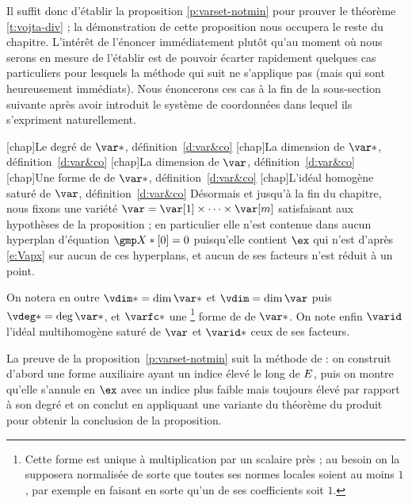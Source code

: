 Il suffit donc d'établir la proposition \ref{p:varset-notmin} pour prouver le
théorème \ref{t:vojta-div} ; la démonstration de cette proposition nous
occupera le reste du chapitre. L'intérêt de l'énoncer immédiatement plutôt
qu'au moment où nous serons en mesure de l'établir est de pouvoir écarter
rapidement quelques cas particuliers pour lesquels la méthode qui suit ne
s'applique pas (mais qui sont heureusement immédiats). Nous énoncerons ces cas
à la fin de la sous-section suivante après avoir introduit le système de
coordonnées dans lequel ils s'expriment naturellement.

\begin{tdef} \label{d:var&co}
  \nomuse {}
  \nomuse{\vdeg*}[chap]{Le degré de \( \var* \), définition~\ref{d:var&co}}
  \nomuse{\vdim*}[chap]{La dimension de \( \var* \),
    définition~\ref{d:var&co}}
  \nomuse{\vdim }[chap]{La dimension de \( \var \), définition~\ref{d:var&co}}
  \nomuse{\varfc*}[chap]{Une forme de  de \( \var* \),
    définition~\ref{d:var&co}}
  \nomuse{\varid}[chap]{L'idéal homogène saturé de \( \var \),
    définition~\ref{d:var&co}}
  Désormais et jusqu'à la fin du chapitre, nous fixons une variété
  \( \var = \var[1] \times \dots \times \var[\puiss] \) satisfaisant aux
  hypothèses de la proposition ; en particulier elle n'est contenue dans aucun
  hyperplan d'équation \( \vmp*[0] = 0 \) puisqu'elle contient
  \( \ex \) qui n'est d'après \eqref{e:Vapx} sur aucun de ces hyperplans, et
  aucun de ses facteurs n'est réduit à un point.

  On notera en outre \( \vdim* = \dim \var* \) et \( \vdim = \dim \var \) puis
  \( \vdeg* = \deg \var* \), et \( \varfc* \) une
  \footnote{\label{fn:varfc}Cette forme est unique à multiplication par un
    scalaire près ; au besoin on la supposera normalisée de sorte que toutes
    ses normes locales soient au moins \( 1 \), par exemple en faisant en
    sorte qu'un de ses coefficients soit \( 1 \).}
  forme de  de \( \var* \). On note enfin \( \varid \) l'idéal
  multihomogène saturé de $\var$ et $\varid*$ ceux de ses facteurs.
\end{tdef}

La preuve de la proposition~\ref{p:varset-notmin} suit la méthode de
\TS : on construit d'abord une forme auxiliaire ayant un indice élevé le long
de \( E \), puis on montre qu'elle s'annule en \( \ex \) avec un indice
plus faible mais toujours élevé par rapport à son degré et on conclut en
appliquant une variante du théorème du produit pour obtenir la conclusion de
la proposition.

